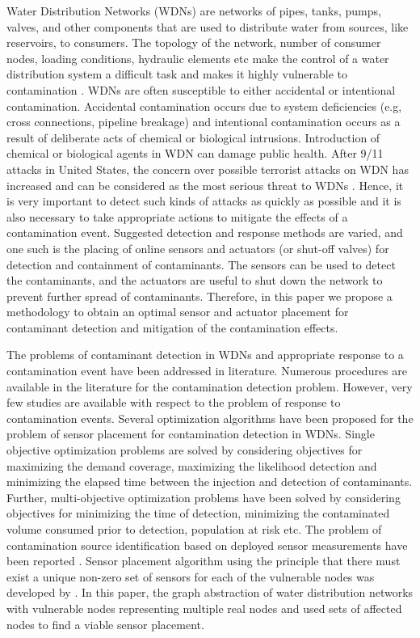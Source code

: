 \documentclass[authoryear,preprint,review,12pt]{elsarticle}
\begin{document}


Water Distribution Networks (WDNs) are networks of pipes, tanks, pumps,
valves, and other components that are used to distribute water from
sources, like reservoirs, to consumers. The  topology of the network, number of consumer nodes, loading conditions, hydraulic elements etc make the control of a water distribution system a difficult task and makes it highly vulnerable to contamination \citep{Kessler}.  WDNs are often susceptible to either accidental or  intentional contamination. Accidental contamination occurs due to  system deficiencies (e.g, cross connections, pipeline breakage) and intentional contamination occurs as a result of deliberate acts of chemical or biological intrusions. Introduction of  chemical or biological agents in WDN can damage public health. After  9/11 attacks in United States, the concern over  possible terrorist attacks on WDN has increased and can be considered as the most serious threat to WDNs \citep{BWSN}. Hence, it is very important to detect such kinds of attacks as quickly as possible  and it is also necessary to take appropriate actions to mitigate the effects of a contamination event. Suggested detection and response methods are varied, and one such is the placing of online sensors and actuators (or shut-off valves) for detection and containment of   contaminants. The sensors can be used to detect the contaminants, and the actuators are useful to shut down the network to  prevent further spread of contaminants. Therefore, in this paper we propose a methodology to obtain an  optimal sensor and actuator placement  for contaminant detection and mitigation of the contamination effects.


The problems of contaminant detection in WDNs and appropriate response to a contamination event have been addressed in literature. Numerous procedures are available in the literature for the contamination detection problem. However, very few studies are available with respect to the problem of response to  contamination events. Several optimization algorithms have been proposed for the problem of sensor placement for contamination detection in WDNs. Single objective optimization problems\citep{Kessler, LEE, BERRY_FLEISCHER,  kumar} are solved by considering  objectives for maximizing the demand coverage,  maximizing the likelihood detection and minimizing the elapsed time between the injection and detection of contaminants. Further, multi-objective optimization problems \citep{BWSN, rico2007water,  Preis2008-Multiobjective, Watson04} have been solved by considering  objectives for minimizing the time of detection, minimizing the contaminated volume consumed prior to detection, population at risk etc. The problem of contamination source identification based on deployed sensor measurements have been reported \citep{mann2012real,Laird}. Sensor placement algorithm using the principle that there must exist a unique non-zero set
of sensors for each of the vulnerable nodes was developed by \cite{Palleti2016246}. In this paper,  the graph abstraction of water distribution networks with vulnerable nodes representing
multiple real nodes and used sets of affected nodes to find a viable sensor placement.
\end{document}
